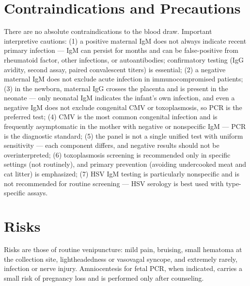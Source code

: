 \section*{Contraindications and Precautions}
There are no absolute contraindications to the blood draw. Important interpretive cautions: (1) a positive maternal IgM does not always indicate recent primary infection --- IgM can persist for months and can be false-positive from rheumatoid factor, other infections, or autoantibodies; confirmatory testing (IgG avidity, second assay, paired convalescent titers) is essential; (2) a negative maternal IgM does not exclude acute infection in immunocompromised patients; (3) in the newborn, maternal IgG crosses the placenta and is present in the neonate --- only neonatal IgM indicates the infant's own infection, and even a negative IgM does not exclude congenital CMV or toxoplasmosis, so PCR is the preferred test; (4) CMV is the most common congenital infection and is frequently asymptomatic in the mother with negative or nonspecific IgM --- PCR is the diagnostic standard; (5) the panel is not a single unified test with uniform sensitivity --- each component differs, and negative results should not be overinterpreted; (6) toxoplasmosis screening is recommended only in specific settings (not routinely), and primary prevention (avoiding undercooked meat and cat litter) is emphasized; (7) HSV IgM testing is particularly nonspecific and is not recommended for routine screening --- HSV serology is best used with type-specific assays.

\section*{Risks}
Risks are those of routine venipuncture: mild pain, bruising, small hematoma at the collection site, lightheadedness or vasovagal syncope, and extremely rarely, infection or nerve injury. Amniocentesis for fetal PCR, when indicated, carries a small risk of pregnancy loss and is performed only after counseling.

